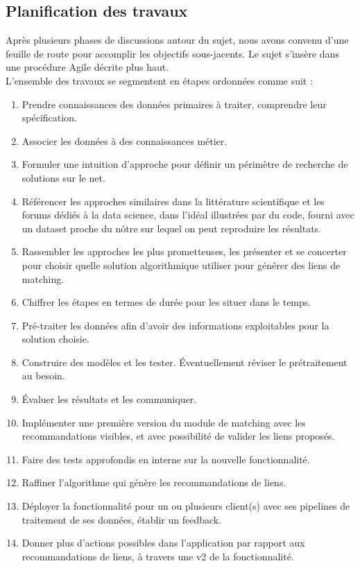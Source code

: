 \documentclass{rapportCS}
\begin{document}
\subsection{Planification des travaux}
Après plusieurs phases de discussions autour du sujet, nous avons convenu d'une feuille de route
pour accomplir les objectifs sous-jacents. Le sujet s'insère dans une procédure Agile décrite plus haut.\\
L'ensemble des travaux se segmentent en étapes ordonnées comme suit :\\
\begin{enumerate}
  \item Prendre connaissances des données primaires à traiter, comprendre leur spécification.
  \item Associer les données à des connaissances métier.
  \item Formuler une intuition d'approche pour définir un périmètre de recherche de solutions sur le net.
  \item Référencer les approches similaires dans la littérature scientifique et les forums dédiés à la data science,
  dans l'idéal illustrées par du code, fourni avec un dataset proche du nôtre sur lequel 
  on peut reproduire les résultats.
  \item Rassembler les approches les plus prometteuses, les présenter et 
  se concerter pour choisir quelle solution algorithmique utiliser pour générer des liens de matching.
  \item Chiffrer les étapes en termes de durée pour les situer dans le temps.
  \item Pré-traiter les données afin d'avoir des informations exploitables pour la solution choisie.
  \item Construire des modèles et les tester. Éventuellement réviser le prétraitement au besoin.
  \item Évaluer les résultats et les communiquer.
  \item Implémenter une première version du module de matching avec les recommandations visibles, et
  avec possibilité de valider les liens proposés.
  \item Faire des tests approfondis en interne sur la nouvelle fonctionnalité.
  \item Raffiner l’algorithme qui génère les recommandations de liens.
  \item Déployer la fonctionnalité pour un ou plusieurs client(s) avec ses pipelines de traitement
  de ses données, établir un feedback.
  \item Donner plus d'actions possibles dans l'application par rapport aux recommandations de liens, à
  travers une v2 de la fonctionnalité.

\end{enumerate}
\end{document}

